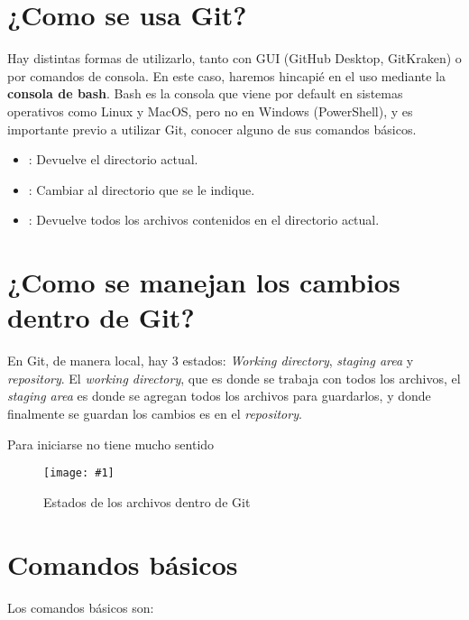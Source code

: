 \documentclass[11pt, twoside]{article}
\newcommand{\img}[3]{\begin{figure}[h] \centering
    \texttt{[image: \#1]}
    \caption{#2}
    \end{figure}}
\newcommand{\code}[1]{\color{Blue}\texttt{\detokenize{#1}}\color{Black}}
\begin{document}
\section{¿Como se usa Git?}
Hay distintas formas de utilizarlo, tanto con GUI (GitHub Desktop, GitKraken) o por comandos de consola. En este caso, haremos hincapié en el uso mediante la \textbf{consola de bash}. Bash es la consola que viene por default en sistemas operativos como Linux y MacOS, pero no en Windows (PowerShell), y es importante previo a utilizar Git, conocer alguno de sus comandos básicos.

\begin{itemize}
    \item \code{pwd}: Devuelve el directorio actual.
    \item \code{cd <path>}: Cambiar al directorio que se le indique.
    \item \code{ls}: Devuelve todos los archivos contenidos en el directorio actual.
\end{itemize}



\section{¿Como se manejan los cambios dentro de Git?}

En Git, de manera local, hay 3 estados:\textit{ Working directory}, \textit{staging area} y \textit{repository}. El \textit{working directory}, que es donde se trabaja con todos los archivos, el \textit{staging area} es donde se agregan todos los archivos para guardarlos, y donde finalmente se guardan los cambios es en el \textit{repository}.

Para iniciarse no tiene mucho sentido 

\img{images/gitstate.png}{Estados de los archivos dentro de Git}{1}

\newpage 

\section{Comandos básicos}

Los comandos básicos son:
\end{document}
